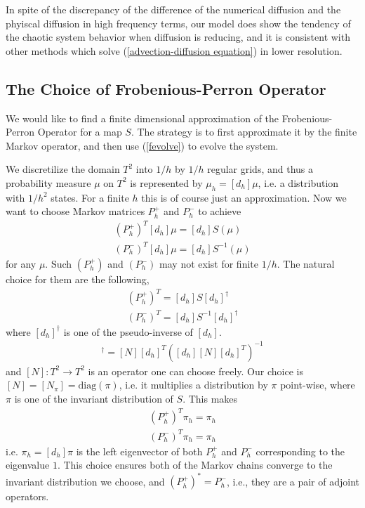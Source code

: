 \documentclass{article}
\begin{document}
In spite of the discrepancy of the difference of the numerical diffusion and the phyiscal diffusion in high frequency terms, our model does show the tendency of the chaotic system behavior when diffusion is reducing, and it is consistent with other methods which solve (\ref{advection-diffusion equation}) in lower resolution.  
    


\subsection{The Choice of Frobenious-Perron Operator}

We would like to find a finite dimensional approximation of the Frobenious-Perron Operator for a map $S$. The strategy is to first approximate it by the finite Markov operator, and then use (\ref{fevolve}) to evolve the system.

We discretilize the domain $T^2$ into $1/h$ by $1/h$ regular grids, and thus a probability measure $\mu$ on $T^2$ is represented by $\mu_h = [d_h]\mu$, i.e. a distribution with $1/h^2$ states. For a finite $h$ this is of course just an approximation. Now we want to choose Markov matrices $P_h^+$ and $P_h^-$ to achieve
 \begin{eqnarray}
 (P_h^+)^T [d_h]\mu = [d_h]S(\mu)\\
 (P_h^-)^T [d_h]\mu = [d_h]S^{-1}(\mu) \nonumber
 \end{eqnarray}
for any $\mu$. Such $(P_h^+)$ and $(P_h^-)$ may not exist for finite $1/h$. The natural choice for them are the following,
 \begin{eqnarray}
 (P_h^+)^T = [d_h]S[d_h]^\dagger \\
 (P_h^-)^T = [d_h]S^{-1}[d_h]^\dagger \nonumber
 \end{eqnarray}
where $[d_h]^\dagger$ is one of the pseudo-inverse of $[d_h]$.
 \begin{eqnarray}
 [d_h]^\dagger = [N][d_h]^T([d_h][N][d_h]^T)^{-1}
 \end{eqnarray}
and $[N]: T^2 \rightarrow T^2$ is an operator one can choose freely. Our choice is $[N]=[N_{\pi}] = \text{diag}(\pi)$, i.e. it multiplies a distribution by $\pi$ point-wise, where $\pi$ is one of the invariant distribution of $S$. This makes
\begin{eqnarray}
  (P_h^+)^T \pi_h =  \pi_h \\
  (P_h^-)^T \pi_h =  \pi_h \nonumber
\end{eqnarray}
i.e. $ \pi_h =[d_h]\pi$ is the left eigenvector of both $P_h^+$ and $P_h^-$ corresponding to the eigenvalue $1$. This choice ensures both of the Markov chains converge to the invariant distribution we choose, and $(P_h^+)^* = P_h^-$, i.e., they are a pair of adjoint operators.
\end{document}
